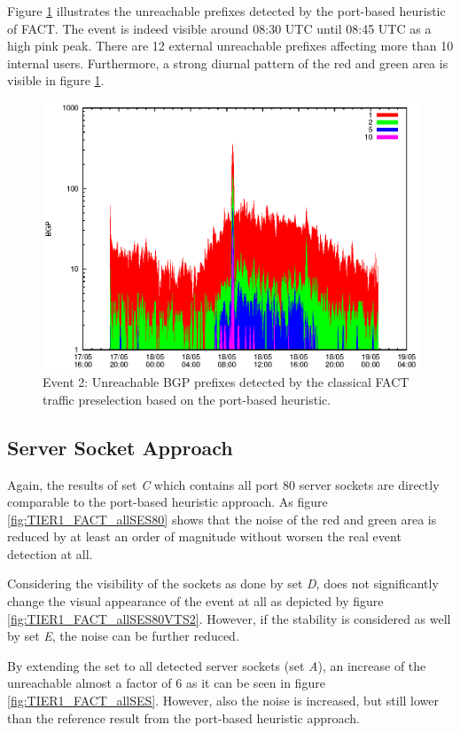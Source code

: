 Figure \ref{fig:TIER1_FACT_REF} illustrates the unreachable prefixes detected by the port-based heuristic of FACT. The event is indeed visible around 08:30 UTC until 08:45 UTC as a high pink peak. There are 12 external unreachable prefixes affecting more than 10 internal users. Furthermore, a strong diurnal pattern of the red and green area is visible in figure \ref{fig:TIER1_FACT_REF}. 
\begin{figure}
	[p] \centering 
	\includegraphics[width=0.75\linewidth]{images/events/2010_05_18/bgp_log_port80_ref.eps} \caption{Event 2: Unreachable BGP prefixes detected by the classical FACT traffic preselection based on the port-based heuristic.} 
	\label{fig:TIER1_FACT_REF} 
\end{figure}

\subsection{Server Socket Approach}

Again, the results of set \emph{C} which contains all port 80 server sockets are directly comparable to the port-based heuristic approach. As figure \ref{fig:TIER1_FACT_allSES80} shows that the noise of the red and green area is reduced by at least an order of magnitude without worsen the real event detection at all.

Considering the visibility of the sockets as done by set \emph{D}, does not significantly change the visual appearance of the event at all as depicted by figure \ref{fig:TIER1_FACT_allSES80VTS2}. However, if the stability is considered as well by set \emph{E}, the noise can be further reduced. 

By extending the set to all detected server sockets (set \emph{A}), an increase of the unreachable almost a factor of 6 as it can be seen in figure \ref{fig:TIER1_FACT_allSES}. However, also the noise is increased, but still lower than the reference result from the port-based heuristic approach. 

